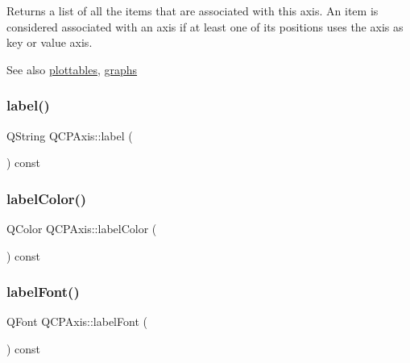 Returns a list of all the items that are associated with this axis. An item is considered associated with an axis if at least one of its positions uses the axis as key or value axis.

\begin{DoxySeeAlso}{See also}
\mbox{\hyperlink{class_q_c_p_axis_ac5e0f6f65c75efb5fd32275d6e4ef0d6}{plottables}}, \mbox{\hyperlink{class_q_c_p_axis_ad590c0da223697a2727f97a520870fec}{graphs}} 
\end{DoxySeeAlso}
\mbox{\label{class_q_c_p_axis_a32ba4d3effcddd8af3bc49f405e1d53e}} 
\subsubsection{\texorpdfstring{label()}{label()}}
{\footnotesize\ttfamily Q\+String Q\+C\+P\+Axis\+::label (\begin{DoxyParamCaption}{ }\end{DoxyParamCaption}) const\hspace{0.3cm}{\ttfamily [inline]}}

\mbox{\label{class_q_c_p_axis_a05794f13d322da7fd9d5554d11186b0e}} 
\subsubsection{\texorpdfstring{labelColor()}{labelColor()}}
{\footnotesize\ttfamily Q\+Color Q\+C\+P\+Axis\+::label\+Color (\begin{DoxyParamCaption}{ }\end{DoxyParamCaption}) const\hspace{0.3cm}{\ttfamily [inline]}}

\mbox{\label{class_q_c_p_axis_aa7b465fe233f1878793954ba5ab9c47e}} 
\subsubsection{\texorpdfstring{labelFont()}{labelFont()}}
{\footnotesize\ttfamily Q\+Font Q\+C\+P\+Axis\+::label\+Font (\begin{DoxyParamCaption}{ }\end{DoxyParamCaption}) const\hspace{0.3cm}{\ttfamily [inline]}}

